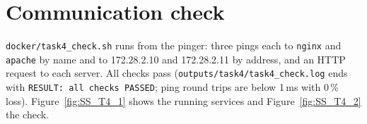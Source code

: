 \section{Communication check}
\texttt{docker/task4\_check.sh} runs from the pinger: three pings each to \texttt{nginx} and \texttt{apache} by name and to 172.28.2.10 and 172.28.2.11 by address, and an HTTP request to each server. All checks pass (\texttt{outputs/task4/task4\_check.log} ends with \texttt{RESULT: all checks PASSED}; ping round trips are below 1\,ms with 0\,\% loss). Figure~\ref{fig:SS_T4_1} shows the running services and Figure~\ref{fig:SS_T4_2} the check.


